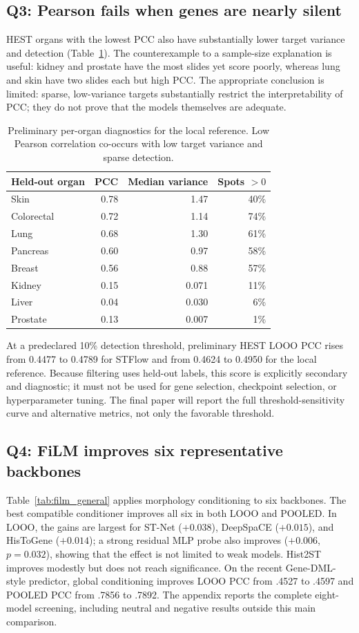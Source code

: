 \subsection{Q3: Pearson fails when genes are nearly silent}
HEST organs with the lowest PCC also have substantially lower target variance and detection
(Table~\ref{tab:floor}). The counterexample to a sample-size explanation is useful: kidney and
prostate have the most slides yet score poorly, whereas lung and skin have two slides each but high
PCC. The appropriate conclusion is limited: sparse, low-variance targets substantially restrict the
interpretability of PCC; they do not prove that the models themselves are adequate.

\begin{table}[t]
\centering\small
\setlength{\tabcolsep}{4pt}
\begin{tabular}{lrrr}
\toprule
Held-out organ & PCC & Median variance & Spots $>0$\\
\midrule
Skin & 0.78 & 1.47 & 40\%\\
Colorectal & 0.72 & 1.14 & 74\%\\
Lung & 0.68 & 1.30 & 61\%\\
Pancreas & 0.60 & 0.97 & 58\%\\
Breast & 0.56 & 0.88 & 57\%\\
Kidney & 0.15 & 0.071 & 11\%\\
Liver & 0.04 & 0.030 & 6\%\\
Prostate & 0.13 & 0.007 & 1\%\\
\bottomrule
\end{tabular}
\caption{Preliminary per-organ diagnostics for the local reference. Low Pearson correlation co-occurs
with low target variance and sparse detection.}
\label{tab:floor}
\end{table}

At a predeclared 10\% detection threshold, preliminary HEST LOOO PCC rises from 0.4477 to 0.4789
for STFlow and from 0.4624 to 0.4950 for the local reference. Because filtering uses held-out labels,
this score is explicitly secondary and diagnostic; it must not be used for gene selection, checkpoint
selection, or hyperparameter tuning. The final paper will report the full threshold-sensitivity curve
and alternative metrics, not only the favorable threshold.

\subsection{Q4: FiLM improves six representative backbones}
Table~\ref{tab:film_general} applies morphology conditioning to six backbones. The best compatible
conditioner improves all six in both LOOO and POOLED. In LOOO,
the gains are largest for ST-Net ($+0.038$), DeepSpaCE ($+0.015$), and HisToGene ($+0.014$); a strong
residual MLP probe also improves ($+0.006$, $p=0.032$), showing that the effect is not limited to weak
models. Hist2ST improves modestly but does not reach significance. On the recent Gene-DML-style
predictor, global conditioning improves LOOO PCC from .4527 to .4597 and POOLED PCC from .7856 to
.7892. The appendix reports the complete eight-model screening, including neutral and negative
results outside this main comparison.

